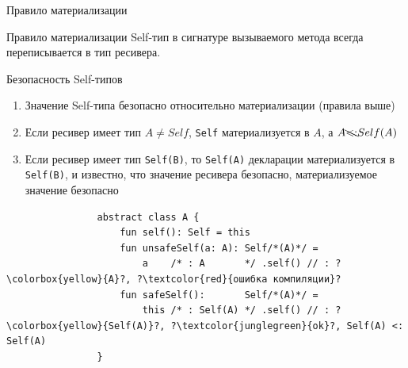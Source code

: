 \documentclass[handout,aspectratio=169,usenames,dvipsnames]{beamer}
\begin{document}
    \begin{frame}[fragile]{Правило материализации}
        \begin{block}{Правило материализации}
            Self-тип в сигнатуре вызываемого метода всегда переписывается в тип ресивера.
        \end{block}
        \begin{block}{Безопасность Self-типов}
            \begin{enumerate}
                \item Значение Self-типа безопасно относительно материализации (правила выше)
                \item Если ресивер имеет тип $A \neq Self$, \texttt{Self} материализуется в $A$, а $A \bcancel{<:} Self(A)$
                \item Если ресивер имеет тип \texttt{Self(B)}, то \texttt{Self(A)} декларации материализуется в \texttt{Self(B)}, и известно, что значение ресивера безопасно, материализуемое значение безопасно
            \end{enumerate}
            \begin{verbatim}
                abstract class A {
                    fun self(): Self = this
                    fun unsafeSelf(a: A): Self/*(A)*/ =
                        a    /* : A       */ .self() // : ?\colorbox{yellow}{A}?, ?\textcolor{red}{ошибка компиляции}?
                    fun safeSelf():       Self/*(A)*/ =
                        this /* : Self(A) */ .self() // : ?\colorbox{yellow}{Self(A)}?, ?\textcolor{junglegreen}{ok}?, Self(A) <: Self(A)
                }
            \end{verbatim}
        \end{block}
    \end{frame}
\end{document}
